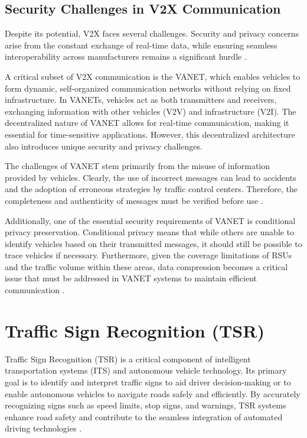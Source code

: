 \subsection{Security Challenges in V2X Communication}

Despite its potential, V2X faces several challenges. Security and privacy concerns arise from the constant exchange 
of real-time data, while ensuring seamless interoperability across manufacturers remains a significant hurdle \cite{zEslami}.

A critical subset of V2X communication is the \ac{VANET}, which enables vehicles to form dynamic,
 self-organized communication networks without relying on fixed infrastructure. In VANETs, vehicles act as both transmitters
  and receivers, exchanging information with other vehicles (V2V) and infrastructure (V2I). The decentralized nature of VANET allows for real-time 
  communication, making it essential for time-sensitive applications. However, this decentralized architecture also 
  introduces unique security and privacy challenges.

The challenges of VANET stem primarily from the misuse of information provided by vehicles. Clearly, the use of
 incorrect messages can lead to accidents and the adoption of erroneous strategies by traffic control centers. 
 Therefore, the completeness and authenticity of messages must be verified before use \cite{zEslami}.

Additionally, one of the essential security requirements of VANET is conditional privacy preservation. 
Conditional privacy means that while others are unable to identify vehicles based on their transmitted messages, 
it should still be possible to trace vehicles if necessary. Furthermore, given the coverage 
limitations of RSUs and the traffic volume within these areas, data compression becomes a critical
 issue that must be addressed in VANET systems to maintain efficient communication \cite{zEslami}.

 \section{Traffic Sign Recognition (\ac{TSR})}

 Traffic Sign Recognition (TSR) is a critical component of intelligent transportation systems (ITS) and autonomous 
 vehicle technology. Its primary goal is to identify and interpret traffic signs to aid driver decision-making or to
  enable autonomous vehicles to navigate roads safely and efficiently. By accurately recognizing signs such as speed 
  limits, stop signs, and warnings, TSR systems enhance road safety and contribute to the seamless integration of
   automated driving technologies \cite{Thakur2024}. 

